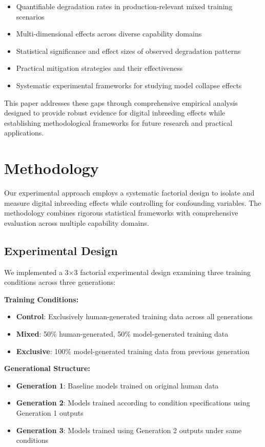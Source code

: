 \documentclass[11pt]{article}
\begin{document}
\begin{itemize}
    \item Quantifiable degradation rates in production-relevant mixed training scenarios
    \item Multi-dimensional effects across diverse capability domains
    \item Statistical significance and effect sizes of observed degradation patterns
    \item Practical mitigation strategies and their effectiveness
    \item Systematic experimental frameworks for studying model collapse effects
\end{itemize}

This paper addresses these gaps through comprehensive empirical analysis designed to provide robust evidence for digital inbreeding effects while establishing methodological frameworks for future research and practical applications.

\section{Methodology}

Our experimental approach employs a systematic factorial design to isolate and measure digital inbreeding effects while controlling for confounding variables. The methodology combines rigorous statistical frameworks with comprehensive evaluation across multiple capability domains.

\subsection{Experimental Design}

We implemented a 3×3 factorial experimental design examining three training conditions across three generations:

\textbf{Training Conditions:}
\begin{itemize}
    \item \textbf{Control}: Exclusively human-generated training data across all generations
    \item \textbf{Mixed}: 50\% human-generated, 50\% model-generated training data
    \item \textbf{Exclusive}: 100\% model-generated training data from previous generation
\end{itemize}

\textbf{Generational Structure:}
\begin{itemize}
    \item \textbf{Generation 1}: Baseline models trained on original human data
    \item \textbf{Generation 2}: Models trained according to condition specifications using Generation 1 outputs
    \item \textbf{Generation 3}: Models trained using Generation 2 outputs under same conditions
\end{itemize}
\end{document}
